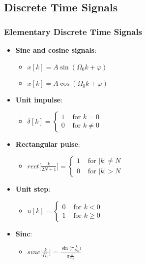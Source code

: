 \subsection{Discrete Time Signals}
\subsubsection{Elementary Discrete Time Signals}
\begin{itemize}
    \item \textbf{Sine and cosine signals}: 
    \begin{itemize}
        \item $x[k] = A\sin(\Omega_0 k + \varphi)$
        \item $x[k] = A\cos(\Omega_0 k + \varphi)$
    \end{itemize}
    \item \textbf{Unit impulse}: 
    \begin{itemize}
        \item $\delta[k] = \left\{\begin{array}{ll} 1 & \text{ for } k=0 \\ 0 & \text{ for } k \neq 0 \end{array}\right.$
    \end{itemize}
    \item \textbf{Rectangular pulse}: 
    \begin{itemize}
        \item $rect\Big[\frac{k}{2N+1}\Big] = \left\{\begin{array}{ll} 1 & \text{ for } |k| \neq N \\ 0 & \text{ for } |k| > N \end{array}\right.$
    \end{itemize}
    \item \textbf{Unit step}: 
    \begin{itemize}
        \item $u[k] = \left\{\begin{array}{ll} 0 & \text{ for } k < 0 \\ 1 & \text{ for } k \geq 0 \end{array}\right.$
    \end{itemize}
    \item \textbf{Sinc}: 
    \begin{itemize}
        \item $sinc\Big[\frac{k}{K_0}\Big] = \frac{\sin\big(\pi\frac{k}{K_0}\big)}{\pi\frac{k}{K_0}}$
    \end{itemize}
\end{itemize}



